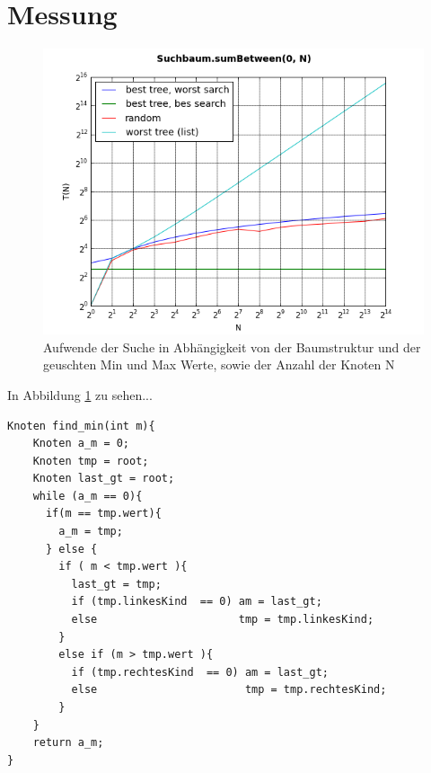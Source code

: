 \documentclass[
   draft=false
  ,paper=a4
  ,twoside=false
  ,fontsize=11pt
  ,headsepline
  ,DIV11
  ,parskip=full+
]{scrartcl} %
\begin{document}
\section{Messung}

\begin{figure}[htp]
  	\centering
    \includegraphics[width=\textwidth]{./IMG/plot.png}
    \caption[shortone]{Aufwende der Suche in Abhängigkeit
     von der Baumstruktur und der geuschten
      Min und Max Werte, sowie der Anzahl der Knoten N}
    \label{fig:plot}
\end{figure}

In Abbildung \ref{fig:plot} zu sehen...


  \begin{lstlisting}
Knoten find_min(int m){
	Knoten a_m = 0;
	Knoten tmp = root;
	Knoten last_gt = root;
	while (a_m == 0){
	  if(m == tmp.wert){
	    a_m = tmp;
	  } else {
	    if ( m < tmp.wert ){
	      last_gt = tmp;
	      if (tmp.linkesKind  == 0) am = last_gt;
	      else                      tmp = tmp.linkesKind;
	    }
	    else if (m > tmp.wert ){
	      if (tmp.rechtesKind  == 0) am = last_gt;
	      else                       tmp = tmp.rechtesKind;
	    }
	}
	return a_m;
}
\end{lstlisting}
\end{document}

